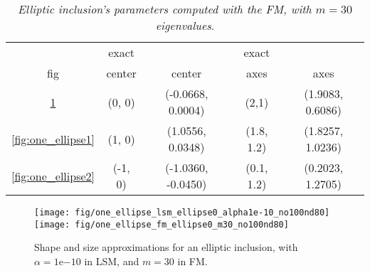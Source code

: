 \begin{table}
\caption{\emph{Elliptic inclusion's parameters computed with the FM, with $m=30$ eigenvalues}.}
\label{tab:ellipse-parameters}
\begin{center}
\vspace*{-0.5cm}
\begin{tabular}{ccccc}
\toprule
 & exact && exact &\\
 fig & center & center & axes  & axes \\
\midrule
\ref{fig:one_ellipse0} & (0, 0) &  (-0.0668, 0.0004) & (2,1) & (1.9083, 0.6086) \\
\ref{fig:one_ellipse1} & (1, 0) &  (1.0556, 0.0348) & (1.8, 1.2) & (1.8257, 1.0236) \\
\ref{fig:one_ellipse2} & (-1, 0) &  (-1.0360, -0.0450) & (0.1, 1.2) & (0.2023, 1.2705) \\

\bottomrule
\end{tabular}
\end{center}
\end{table}

\begin{center}
\begin{figure}
{
\texttt{[image: fig/one\_ellipse\_lsm\_ellipse0\_alpha1e-10\_no100nd80]}
}
{
\texttt{[image: fig/one\_ellipse\_fm\_ellipse0\_m30\_no100nd80]}
}
\caption{Shape and size approximations for an elliptic inclusion, with $\alpha=\mathrm{1e}{-10}$ in LSM, 
and $m=30$ in FM.}
\label{fig:one_ellipse0}
\end{figure}
\end{center}


